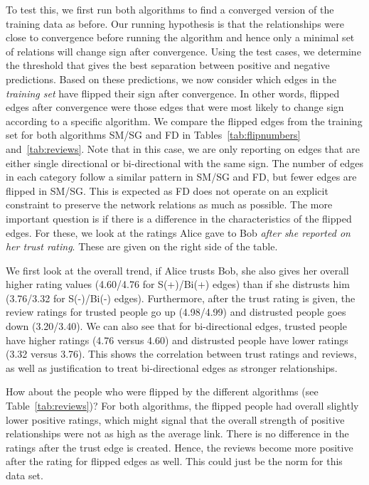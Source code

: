 \documentclass[acmtweb]{acmsmall}
\begin{document}
To test this, we first run both algorithms to find a converged version
of the training data as before. Our running hypothesis is that the
relationships were close to convergence before running the algorithm
and hence only a minimal set of relations will change sign after
convergence. Using the test cases, we determine the threshold that
gives the best separation between positive and negative
predictions. Based on these predictions, we now consider which edges
in the {\em training set} have flipped their sign after
convergence. In other words, flipped edges after convergence were
those edges that were most likely to change sign according to a
specific algorithm. We compare the flipped edges from the training set
for both algorithms SM/SG and FD in Tables~\ref{tab:flipnumbers}
and~\ref{tab:reviews}. Note that in this case, we are only reporting
on edges that are either single directional or bi-directional with the
same sign. The number of edges in each category follow a similar
pattern in SM/SG and FD, but fewer edges are flipped in SM/SG. This is
expected as FD does not operate on an explicit constraint to preserve
the network relations as much as possible.  The more important
question is if there is a difference in the characteristics of the
flipped edges. For these, we look at the ratings Alice gave to Bob
{\em after she reported on her trust rating}. These are given on the
right side of the table.

We first look at the overall trend, if Alice trusts Bob, she also
gives her overall higher rating values (4.60/4.76 for S(+)/Bi(+)
edges) than if she distrusts him (3.76/3.32 for S(-)/Bi(-)
edges). Furthermore, after the trust rating is given, the review
ratings for trusted people go up (4.98/4.99) and distrusted people
goes down (3.20/3.40). We can also see that for bi-directional edges,
trusted people have higher ratings (4.76 versus 4.60) and distrusted
people have lower ratings (3.32 versus 3.76).  This shows the
correlation between trust ratings and reviews, as well as
justification to treat bi-directional edges as stronger relationships.

How about the people who were flipped by the different algorithms (see
Table~\ref{tab:reviews})? For both algorithms, the flipped people had
overall slightly lower positive ratings, which might signal that the
overall strength of positive relationships were not as high as the
average link. There is no difference in the ratings after the trust
edge is created. Hence, the reviews become more positive after the
rating for flipped edges as well. This could just be the norm for this
data set. 
\end{document}
